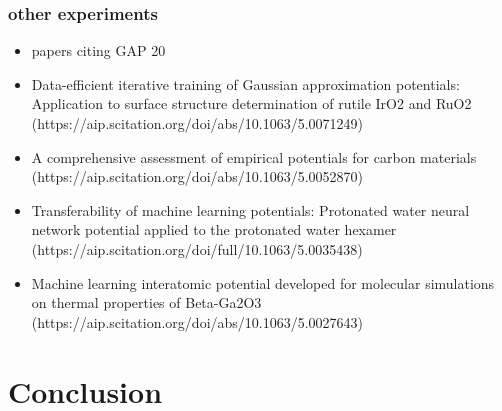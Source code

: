 \documentclass[12pt]{scrartcl}
\begin{document}
\subsubsection{other experiments}  
\begin{itemize}
    \item papers citing GAP 20
    \item Data-efficient iterative training of Gaussian approximation potentials: Application to surface structure determination of rutile IrO2 and RuO2 (https://aip.scitation.org/doi/abs/10.1063/5.0071249)
    \item A comprehensive assessment of empirical potentials for carbon materials (https://aip.scitation.org/doi/abs/10.1063/5.0052870)
    \item Transferability of machine learning potentials: Protonated water neural network potential applied to the protonated water hexamer (https://aip.scitation.org/doi/full/10.1063/5.0035438)
    \item Machine learning interatomic potential developed for molecular simulations on thermal properties of Beta-Ga2O3 (https://aip.scitation.org/doi/abs/10.1063/5.0027643)
\end{itemize}
\newpage

\section{Conclusion}

\newpage



\end{document}
